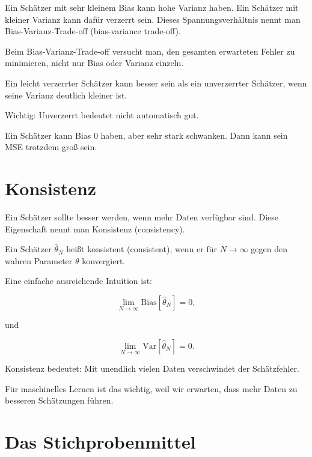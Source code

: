 Ein Schätzer mit sehr kleinem Bias kann hohe Varianz haben.
Ein Schätzer mit kleiner Varianz kann dafür verzerrt sein.
Dieses Spannungsverhältnis nennt man Bias-Varianz-Trade-off (bias-variance trade-off).

\begin{conceptbox}
Beim Bias-Varianz-Trade-off versucht man, den gesamten erwarteten Fehler zu minimieren, nicht nur Bias oder Varianz einzeln.

Ein leicht verzerrter Schätzer kann besser sein als ein unverzerrter Schätzer, wenn seine Varianz deutlich kleiner ist.
\end{conceptbox}

\begin{examtipbox}
Wichtig:
Unverzerrt bedeutet nicht automatisch gut.

Ein Schätzer kann Bias \(0\) haben, aber sehr stark schwanken.
Dann kann sein MSE trotzdem groß sein.
\end{examtipbox}

\section{Konsistenz}

Ein Schätzer sollte besser werden, wenn mehr Daten verfügbar sind.
Diese Eigenschaft nennt man Konsistenz (consistency).

\begin{definitionbox}
Ein Schätzer \(\hat{\theta}_N\) heißt konsistent (consistent), wenn er für \(N \to \infty\) gegen den wahren Parameter \(\theta\) konvergiert.

Eine einfache ausreichende Intuition ist:

\[
    \lim_{N \to \infty}
    \mathrm{Bias}[\hat{\theta}_N]
    =
    0,
\]

und

\[
    \lim_{N \to \infty}
    \mathrm{Var}[\hat{\theta}_N]
    =
    0.
\]
\end{definitionbox}

\begin{conceptbox}
Konsistenz bedeutet:
Mit unendlich vielen Daten verschwindet der Schätzfehler.

Für maschinelles Lernen ist das wichtig, weil wir erwarten, dass mehr Daten zu besseren Schätzungen führen.
\end{conceptbox}

\section{Das Stichprobenmittel}


